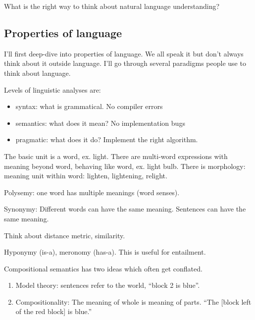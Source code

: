 What is the right way to think about natural language understanding?

\subsection{Properties of language}

I'll first deep-dive into properties of language. We all speak it but don't always think about it outside language. I'll go through several paradigms people use to think about language.

Levels of linguistic analyses are:
\begin{itemize}
\item
syntax: what is grammatical. No compiler errors
\item
semantics: what does it mean? No implementation bugs
\item
pragmatic: what does it do?
Implement the right algorithm.
\end{itemize}

The basic unit is a word, ex. light. There are multi-word expressions with meaning beyond word, behaving like word, ex. light bulb. There is morphology: meaning unit within word: lighten, lightening, relight.

Polysemy: one word has multiple meanings (word senses).

Synonymy: Different words can have the same meaning. Sentences can have the same meaning.

Think about distance metric, similarity.

Hyponymy (is-a), meronomy (has-a). This is useful for entailment.

Compositional semantics has two ideas which often get conflated.
\begin{enumerate}
\item
Model theory: sentences refer to the world, ``block 2 is blue''.
\item
Compositionality: The meaning of whole is meaning of parts.
``The [block left of the red block] is blue.''
\end{enumerate}


